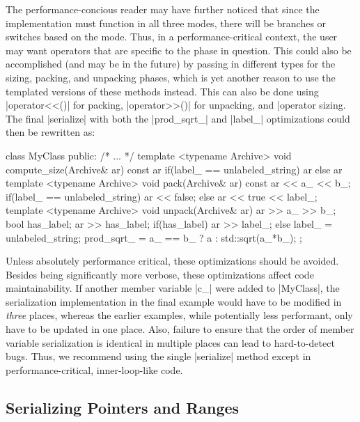 The performance-concious reader may have further noticed that since
the  implementation must function in all three modes,
there will be branches or switches based on the mode.  Thus, in a
performance-critical context, the user may want operators that are specific to the phase in question.
This could also be accomplished (and may be in the future) by passing in different types
for the sizing, packing, and unpacking phases, which is yet another reason to
use the templated versions of these methods instead. This can also be done using
|operator<<()| for packing, |operator>>()| for unpacking, and |operator%
sizing.  The final |serialize| with both the |prod_sqrt_| and |label_|
optimizations could then be rewritten as:
%
\begin{CppCodeNumb}
class MyClass {
  public:
    /* ... */
    template <typename Archive>
    void compute_size(Archive& ar) const {
      ar %
      if(label_ == unlabeled_string) ar %
      else ar %
    }
    template <typename Archive>
    void pack(Archive& ar) const {
      ar << a_ << b_;
      if(label_ == unlabeled_string) ar << false;
      else ar << true << label_;
    }
    template <typename Archive>
    void unpack(Archive& ar) {
      ar >> a_ >> b_;
      bool has_label;
      ar >> has_label;
      if(has_label) ar >> label_;
      else label_ = unlabeled_string;
      prod_sqrt_ = a_ == b_ ? a : std::sqrt(a_*b_);
    }
};
\end{CppCodeNumb}
Unless absolutely performance critical, these optimizations should be avoided.
Besides being significantly more verbose, these optimizations
affect code maintainability.  
If another member variable |c_| were added to |MyClass|, the serialization implementation in the
final example would have to be modified in {\it three} places, whereas the
earlier examples, while potentially less performant, only have to be updated in
one place.  Also, failure to ensure that the order of member variable
serialization is identical in multiple places can lead to hard-to-detect bugs. 
Thus, we recommend using the single |serialize| method except in
performance-critical, inner-loop-like code.

\subsection{Serializing Pointers and Ranges}

